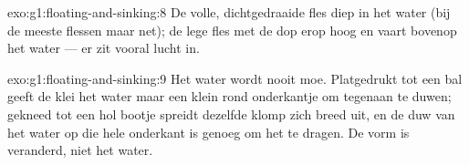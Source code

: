 \begin{solution}{exo:g1:floating-and-sinking:8}
De volle, dichtgedraaide fles  diep in het water (bij de
meeste flessen maar net); de lege fles met de dop erop  hoog
en vaart bovenop het water --- er zit vooral lucht in.
\end{solution}

\begin{solution}{exo:g1:floating-and-sinking:9}
Het water wordt nooit moe. Platgedrukt tot een bal geeft de klei het
water maar een klein rond onderkantje om tegenaan te duwen; gekneed
tot een hol bootje spreidt dezelfde klomp zich breed uit, en de duw
van het water op die hele onderkant is genoeg om het te dragen. De
vorm is veranderd, niet het water.
\end{solution}
